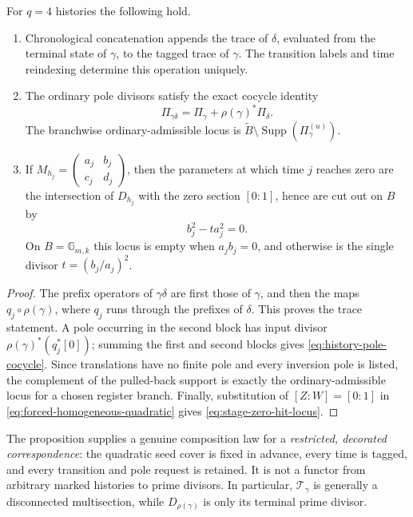 \begin{proposition}
\label{prop:trace-pole-cocycle}
For \(q=4\) histories the following hold.
\begin{enumerate}
\item Chronological concatenation appends the trace of \(\delta\), evaluated
from the terminal state of \(\gamma\), to the tagged trace of \(\gamma\).
The transition labels and time reindexing determine this operation uniquely.
\item The ordinary pole divisors satisfy the exact cocycle identity
\begin{equation}
 \Pi_{\gamma\delta}
 =\Pi_\gamma+\rho(\gamma)^*\Pi_\delta.
 \label{eq:history-pole-cocycle}
\end{equation}
The branchwise ordinary-admissible locus is
\(\widetilde B\setminus\operatorname{Supp}(\Pi_\gamma^{(u)})\).
\item If
\(M_{h_j}=\left(\begin{smallmatrix}a_j&b_j\\c_j&d_j\end{smallmatrix}\right)\),
then the parameters at which time \(j\) reaches zero are the intersection of
\(D_{h_j}\) with the zero section \([0:1]\), hence are cut out on \(B\) by
\begin{equation}
 b_j^2-t a_j^2=0.
 \label{eq:stage-zero-hit-locus}
\end{equation}
On \(B=\mathbb G_{m,k}\) this locus is empty when \(a_jb_j=0\), and otherwise
is the single divisor \(t=(b_j/a_j)^2\).
\end{enumerate}
\end{proposition}

\begin{proof}
The prefix operators of \(\gamma\delta\) are first those of \(\gamma\), and
then the maps \(q_j\circ\rho(\gamma)\), where \(q_j\) runs through the prefixes
of \(\delta\).  This proves the trace statement.  A pole occurring in the
second block has input divisor
\(\rho(\gamma)^*(q_j^*[0])\); summing the first and second blocks gives
\eqref{eq:history-pole-cocycle}.  Since translations have no finite pole and
every inversion pole is listed, the complement of the pulled-back support is
exactly the ordinary-admissible locus for a chosen register branch.  Finally,
substitution of \([Z:W]=[0:1]\) in
\eqref{eq:forced-homogeneous-quadratic} gives
\eqref{eq:stage-zero-hit-locus}.
\end{proof}

The proposition supplies a genuine composition law for a \emph{restricted,
decorated correspondence}: the quadratic seed cover is fixed in advance, every
time is tagged, and every transition and pole request is retained.  It is not a
functor from arbitrary marked histories to prime divisors.  In particular,
\(\mathcal T_\gamma\) is generally a disconnected multisection, while
\(D_{\rho(\gamma)}\) is only its terminal prime divisor.

